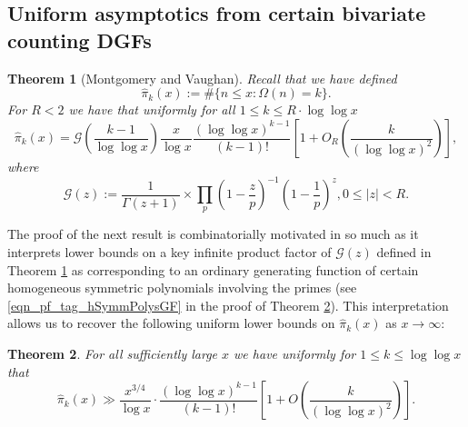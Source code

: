 \documentclass[11pt,reqno,a4letter]{article}
\numberwithin{figure}{section}
\numberwithin{table}{section}
\theoremstyle{plain}
\newtheorem{theorem}{Theorem}
\numberwithin{theorem}{section}
\theoremstyle{definition}
\begin{document}
\subsection{Uniform asymptotics from certain bivariate counting DGFs} 

\begin{theorem}[Montgomery and Vaughan]
\label{theorem_HatPi_ExtInTermsOfGz} 
Recall that we have defined 
$$\widehat{\pi}_k(x) := \#\{n \leq x: \Omega(n)=k\}.$$ 
For $R < 2$ we have that uniformly for all $1 \leq k \leq R \cdot \log\log x$ 
\[
\widehat{\pi}_k(x) = \mathcal{G}\left(\frac{k-1}{\log\log x}\right) \frac{x}{\log x} 
     \frac{(\log\log x)^{k-1}}{(k-1)!} \left[1 + O_R\left(\frac{k}{(\log\log x)^2}\right)\right], 
\]
where 
\[
\mathcal{G}(z) := \frac{1}{\Gamma(z+1)} \times 
     \prod_p \left(1-\frac{z}{p}\right)^{-1} \left(1-\frac{1}{p}\right)^z, 0 \leq |z| < R. 
\]
\end{theorem} 

The proof of the next result is combinatorially motivated in so much as it interprets 
lower bounds on a key infinite product factor of $\mathcal{G}(z)$ defined in 
Theorem \ref{theorem_HatPi_ExtInTermsOfGz} 
as corresponding to an ordinary generating function of certain 
homogeneous symmetric polynomials involving the primes 
(see \eqref{eqn_pf_tag_hSymmPolysGF} in the proof of 
Theorem \ref{theorem_GFs_SymmFuncs_SumsOfRecipOfPowsOfPrimes}). 
This interpretation allows us to recover the 
following uniform lower bounds on $\widehat{\pi}_k(x)$ as $x \rightarrow \infty$: 

\begin{theorem} 
\label{theorem_GFs_SymmFuncs_SumsOfRecipOfPowsOfPrimes} 
\label{cor_BoundsOnGz_FromMVBook_initial_stmt_v1} 
For all sufficiently large $x$ we have uniformly for $1 \leq k \leq \log\log x$ that 
\[
\widehat{\pi}_k(x) \gg 
     \frac{x^{3/4}}{\log x} \cdot 
     \frac{(\log\log x)^{k-1}}{(k-1)!} \left[1 + 
     O\left(\frac{k}{(\log\log x)^2}\right)\right]. 
\]
\end{theorem} 
\end{document}

